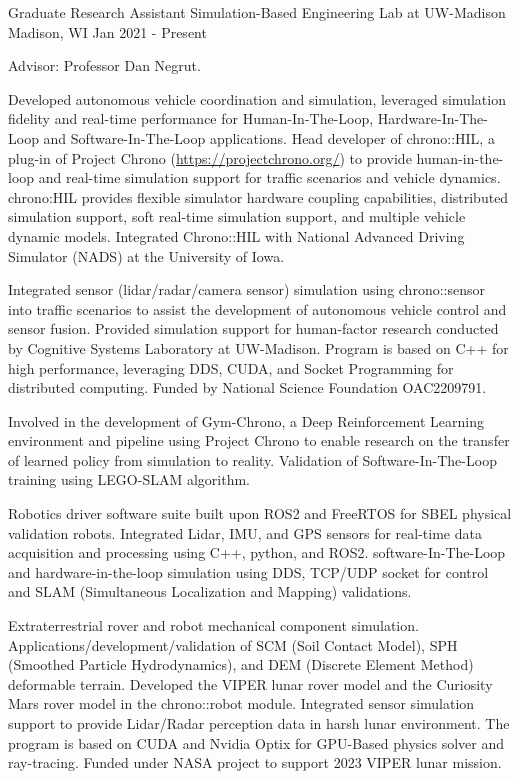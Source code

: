 \begin{cventries}
  \cventry
	{Graduate Research Assistant} %
	{Simulation-Based Engineering Lab at UW-Madison} %
	{Madison, WI} %
	{Jan 2021 - Present} %
	{
		\begin{cvitems} %
			\item {Advisor: Professor Dan Negrut.}
			\item {Developed autonomous vehicle coordination and simulation, leveraged simulation fidelity and real-time performance for Human-In-The-Loop, Hardware-In-The-Loop and Software-In-The-Loop applications. Head developer of chrono::HIL, a plug-in of Project Chrono (\url{https://projectchrono.org/}) to provide human-in-the-loop and real-time simulation support for traffic scenarios and vehicle dynamics. chrono:HIL provides flexible simulator hardware coupling capabilities, distributed simulation support, soft real-time simulation support, and multiple vehicle dynamic models. Integrated Chrono::HIL with National Advanced Driving Simulator (NADS) at the University of Iowa.} 
			\item {Integrated sensor (lidar/radar/camera sensor) simulation using chrono::sensor into traffic scenarios to assist the development of autonomous vehicle control and sensor fusion. Provided simulation support for human-factor research conducted by Cognitive Systems Laboratory at UW-Madison. Program is based on C++ for high performance, leveraging DDS, CUDA, and Socket Programming for distributed computing. Funded by National Science Foundation OAC2209791.}
			\item {Involved in the development of Gym-Chrono, a Deep Reinforcement Learning environment and pipeline using Project Chrono to enable research on the transfer of learned policy from simulation to reality. Validation of Software-In-The-Loop training using LEGO-SLAM algorithm.}
			\item{
			Robotics driver software suite built upon ROS2 and FreeRTOS for SBEL physical validation robots. Integrated Lidar, IMU, and GPS sensors for real-time data acquisition and processing using C++, python, and ROS2. software-In-The-Loop and hardware-in-the-loop simulation using DDS, TCP/UDP socket for control and SLAM (Simultaneous Localization and Mapping) validations. }
			\item {Extraterrestrial rover and robot mechanical component simulation. Applications/development/validation of SCM (Soil Contact Model), SPH (Smoothed Particle Hydrodynamics), and DEM (Discrete Element Method) deformable terrain. Developed the VIPER lunar rover model and the Curiosity Mars rover model in the chrono::robot module. Integrated sensor simulation support to provide Lidar/Radar perception data in harsh lunar environment. The program is based on CUDA and Nvidia Optix for GPU-Based physics solver and ray-tracing. Funded under NASA project to support 2023 VIPER lunar mission.}
		\end{cvitems}
	}



\end{cventries}

